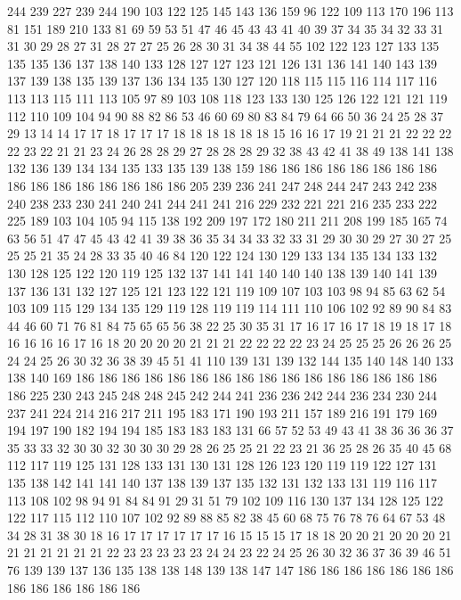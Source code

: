 244 239 227 239 244 190 103 122 125 145 143 136 159 96 122 109 113 170 196 113
81 151 189 210 133 81 69 59 53 51 47 46 45 43 43 41 40 39 37 34
35 34 32 33 31 31 30 29 28 27 31 28 27 27 25 26 28 30 31 34
38 44 55 102 122 123 127 133 135 135 135 136 137 138 140 133 128 127 127 123
121 126 131 136 141 140 143 139 137 139 138 135 139 137 136 134 135 130 127 120
118 115 115 116 114 117 116 113 113 115 111 113 105 97 89 103 108 118 123 133
130 125 126 122 121 121 119 112 110 109 104 94 90 88 82 86 53 46 60 69
80 83 84 79 64 66 50 36 24 25 28 37 29 13 14 14 17 17 18 17
17 17 18 18 18 18 18 18 15 16 16 17 19 21 21 21 22 22 22 22
23 22 21 21 23 24 26 28 28 29 27 28 28 28 29 32 38 43 42 41
38 49 138 141 138 132 136 139 134 134 135 133 135 139 138 159 186 186 186 186
186 186 186 186 186 186 186 186 186 186 186 186 205 239 236 241 247 248 244 247
243 242 238 240 238 233 230 241 240 241 244 241 241 216 229 232 221 221 216 235
233 222 225 189 103 104 105 94 115 138 192 209 197 172 180 211 211 208 199 185
165 74 63 56 51 47 47 45 43 42 41 39 38 36 35 34 34 33 32 33
31 29 30 30 29 27 30 27 25 25 25 21 35 24 28 33 35 40 46 84
120 122 124 130 129 133 134 135 134 133 132 130 128 125 122 120 119 125 132 137
141 141 140 140 140 138 139 140 141 139 137 136 131 132 127 125 121 123 122 121
119 109 107 103 103 98 94 85 63 62 54 103 109 115 129 134 135 129 119 128
119 119 114 111 110 106 102 92 89 90 84 83 44 46 60 71 76 81 84 75
65 65 56 38 22 25 30 35 31 17 16 17 16 17 18 19 18 17 18 16
16 16 16 17 16 18 20 20 20 20 21 21 21 22 22 22 22 23 24 25
25 25 26 26 26 25 24 24 25 26 30 32 36 38 39 45 51 41 110 139
131 139 132 144 135 140 148 140 133 138 140 169 186 186 186 186 186 186 186 186
186 186 186 186 186 186 186 186 186 225 230 243 245 248 248 245 242 244 241 236
236 242 244 236 234 230 244 237 241 224 214 216 217 211 195 183 171 190 193 211
157 189 216 191 179 169 194 197 190 182 194 194 185 183 183 183 131 66 57 52
53 49 43 41 38 36 36 36 37 35 33 33 32 30 30 32 30 30 30 29
28 26 25 25 21 22 23 21 36 25 28 26 35 40 45 68 112 117 119 125
131 128 133 131 130 131 128 126 123 120 119 119 122 127 131 135 138 142 141 141
140 137 138 139 137 135 132 131 132 133 131 119 116 117 113 108 102 98 94 91
84 84 91 29 31 51 79 102 109 116 130 137 134 128 125 122 122 117 115 112
110 107 102 92 89 88 85 82 38 45 60 68 75 76 78 76 64 67 53 48
34 28 31 38 30 18 16 17 17 17 17 17 17 16 15 15 15 17 18 18
20 20 21 20 20 20 21 21 21 21 21 21 21 22 23 23 23 23 23 24
24 23 22 24 25 26 30 32 36 37 36 39 46 51 76 139 139 137 136 135
138 138 148 139 138 147 147 186 186 186 186 186 186 186 186 186 186 186 186 186
